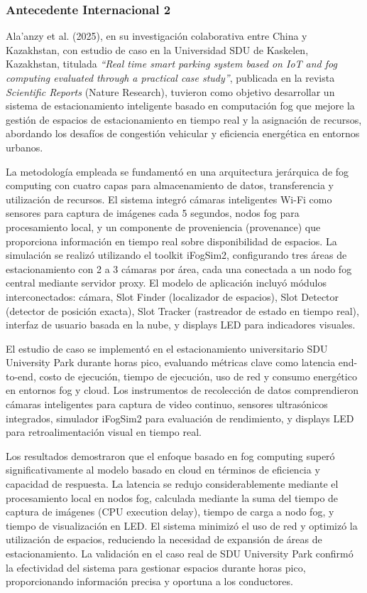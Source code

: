 \documentclass[12pt,a4paper]{article}
\begin{document}
\subsubsection{Antecedente Internacional 2}

Ala'anzy et al. (2025), en su investigación colaborativa entre China y Kazakhstan, con estudio de caso en la Universidad SDU de Kaskelen, Kazakhstan, titulada \textit{``Real time smart parking system based on IoT and fog computing evaluated through a practical case study''}, publicada en la revista \textit{Scientific Reports} (Nature Research), tuvieron como objetivo desarrollar un sistema de estacionamiento inteligente basado en computación fog que mejore la gestión de espacios de estacionamiento en tiempo real y la asignación de recursos, abordando los desafíos de congestión vehicular y eficiencia energética en entornos urbanos.

La metodología empleada se fundamentó en una arquitectura jerárquica de fog computing con cuatro capas para almacenamiento de datos, transferencia y utilización de recursos. El sistema integró cámaras inteligentes Wi-Fi como sensores para captura de imágenes cada 5 segundos, nodos fog para procesamiento local, y un componente de proveniencia (provenance) que proporciona información en tiempo real sobre disponibilidad de espacios. La simulación se realizó utilizando el toolkit iFogSim2, configurando tres áreas de estacionamiento con 2 a 3 cámaras por área, cada una conectada a un nodo fog central mediante servidor proxy. El modelo de aplicación incluyó módulos interconectados: cámara, Slot Finder (localizador de espacios), Slot Detector (detector de posición exacta), Slot Tracker (rastreador de estado en tiempo real), interfaz de usuario basada en la nube, y displays LED para indicadores visuales.

El estudio de caso se implementó en el estacionamiento universitario SDU University Park durante horas pico, evaluando métricas clave como latencia end-to-end, costo de ejecución, tiempo de ejecución, uso de red y consumo energético en entornos fog y cloud. Los instrumentos de recolección de datos comprendieron cámaras inteligentes para captura de video continuo, sensores ultrasónicos integrados, simulador iFogSim2 para evaluación de rendimiento, y displays LED para retroalimentación visual en tiempo real.

Los resultados demostraron que el enfoque basado en fog computing superó significativamente al modelo basado en cloud en términos de eficiencia y capacidad de respuesta. La latencia se redujo considerablemente mediante el procesamiento local en nodos fog, calculada mediante la suma del tiempo de captura de imágenes (CPU execution delay), tiempo de carga a nodo fog, y tiempo de visualización en LED. El sistema minimizó el uso de red y optimizó la utilización de espacios, reduciendo la necesidad de expansión de áreas de estacionamiento. La validación en el caso real de SDU University Park confirmó la efectividad del sistema para gestionar espacios durante horas pico, proporcionando información precisa y oportuna a los conductores.
\end{document}
